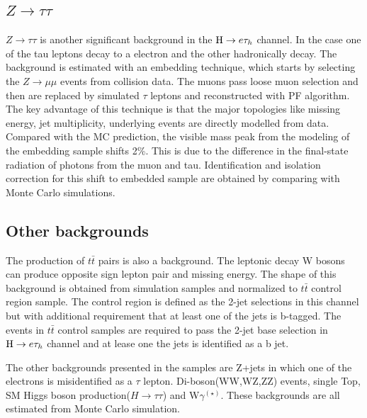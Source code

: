 \subsection{$Z \to \tau \tau$}
$Z \to \tau \tau$ is another significant background in the $\mathrm{H} \to e \tau_{h}$ channel. In the case one of the tau leptons decay to a electron and the other hadronically decay. The background is estimated with an embedding technique\cite{Chatrchyan:2014nva}, which starts by selecting the $Z \to \mu\mu$ events from collision data. The muons pass loose muon selection and then are replaced by simulated $\tau$ leptons and reconstructed with PF algorithm. The key advantage of this technique is that the major topologies like missing energy, jet multiplicity, underlying events are directly modelled from data. Compared with the MC prediction, the visible mass peak from the modeling of the embedding sample shifts 2\%. This is due to the difference in the final-state radiation of photons from the muon and tau. Identification and isolation correction for this shift to embedded sample are obtained by comparing with Monte Carlo simulations.

\subsection{Other backgrounds}
The production of $t\bar{t}$ pairs is also a background. The leptonic decay W bosons can produce opposite sign lepton pair and missing energy. The shape of this background is obtained from simulation samples and normalized to $t\bar{t}$ control region sample. The control region is defined as the 2-jet selections in this channel but with additional requirement that at least one of the jets is b-tagged. The events in  $t\bar{t}$ control samples are required to pass the 2-jet base selection in $\mathrm{H} \to e \tau_{h}$ channel and at lease one the jets is identified as a b jet. 

The other backgrounds presented in the samples are Z+jets in which one of the electrons is misidentified as a $\tau$ lepton. Di-boson(WW,WZ,ZZ) events, single Top, SM Higgs boson production($H \to \tau \tau$)  and W$\gamma^{(\star)}$. These backgrounds are all estimated from Monte Carlo simulation. 









   



